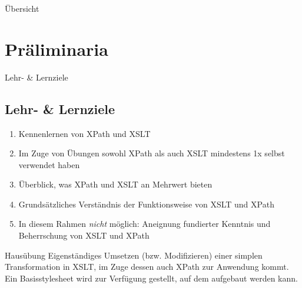 \documentclass[10pt]{beamer}
\begin{document}
 
\frame{\titlepage}

\begin{frame}{Übersicht}%
\tableofcontents
\end{frame}
 
\section{Präliminaria}

\begin{frame}{Lehr- \& Lernziele}
\subsection{Lehr- \& Lernziele}
\begin{enumerate}
    \item Kennenlernen von XPath und XSLT
    \item Im Zuge von Übungen sowohl XPath als auch XSLT mindestens 1x selbst verwendet haben 
    \item Überblick, was XPath und XSLT an Mehrwert bieten
    \item Grundsätzliches Verständnis der Funktionsweise von XSLT und XPath
    \item \alert{In diesem Rahmen \emph{nicht} möglich}: Aneignung fundierter Kenntnis und Beherrschung von XSLT und XPath 
\end{enumerate}

\begin{alertblock}{Hausübung}
\footnotesize
Eigenständiges Umsetzen (bzw. Modifizieren) einer simplen Transformation in XSLT, im Zuge dessen auch XPath zur Anwendung kommt. Ein Basisstylesheet wird zur Verfügung gestellt, auf dem aufgebaut werden kann.
\end{alertblock}
\end{frame}
\end{document}
